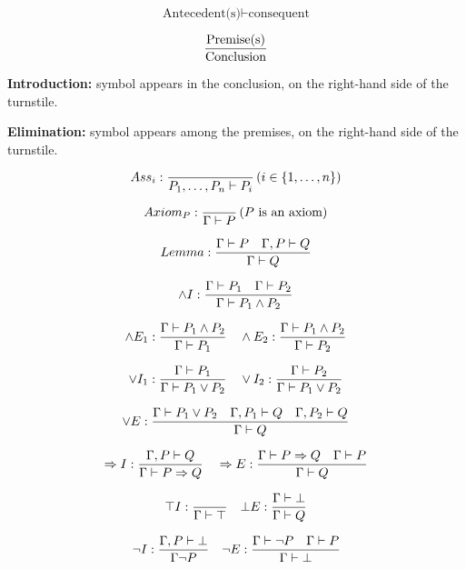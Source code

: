 \newcommand{\sequent}[2]{{\displaystyle #1\over\displaystyle #2}}

$$\text{Antecedent(s)} \vdash \text{consequent}$$

$$
\sequent{
  \text{Premise(s)}
}{
  \text{Conclusion}
}
$$

\textbf{Introduction:} symbol appears in the conclusion, on the right-hand side
of the turnstile.

\textbf{Elimination:} symbol appears among the premises, on the right-hand side
of the turnstile.

$$
Ass_i:
\sequent{
}{
  P_1,\ldots,P_n \vdash P_i
}
\p{i\in\set{1,\ldots,n}}
$$

$$
Axiom_P:
\sequent{
}{
  \Gamma \vdash P
}
\p{P\ \text{is an axiom}}
$$

$$
Lemma:
\sequent{
  \Gamma \vdash P \quad \Gamma, P \vdash Q
}{
  \Gamma \vdash Q
}
$$

$$
\wedge I:
\sequent{
  \Gamma \vdash P_1 \quad \Gamma \vdash P_2
}{
  \Gamma \vdash P_1 \wedge P_2
}
$$

$$
\wedge E_1:
\sequent{
  \Gamma \vdash P_1 \wedge P_2
}{
  \Gamma \vdash P_1
}
\quad
\wedge E_2:
\sequent{
  \Gamma \vdash P_1 \wedge P_2
}{
  \Gamma \vdash P_2
}
$$

$$
\vee I_1:
\sequent{
  \Gamma \vdash P_1
}{
  \Gamma \vdash P_1 \vee P_2
}
\quad
\vee I_2:
\sequent{
  \Gamma \vdash P_2
}{
  \Gamma \vdash P_1 \vee P_2
}
$$

$$
\vee E:
\sequent{
  \Gamma \vdash P_1 \vee P_2
  \quad
  \Gamma, P_1 \vdash Q
  \quad
  \Gamma, P_2 \vdash Q
}{
  \Gamma \vdash Q
}
$$

$$
\Rightarrow I:
\sequent{
  \Gamma, P \vdash Q
}{
  \Gamma \vdash P \Rightarrow Q
}
\quad
\Rightarrow E:
\sequent{
  \Gamma \vdash P \Rightarrow Q
  \quad
  \Gamma \vdash P
}{
  \Gamma \vdash Q
}
$$

$$
\top I:
\sequent{
}{
  \Gamma \vdash \top
}
\quad
\bot E:
\sequent{
  \Gamma \vdash \bot
}{
  \Gamma \vdash Q
}
$$

$$
\neg I:
\sequent{
  \Gamma, P \vdash \bot
}{
  \Gamma \neg P
}
\quad
\neg E:
\sequent{
  \Gamma \vdash \neg P \quad \Gamma \vdash P
}{
  \Gamma \vdash \bot
}
$$

